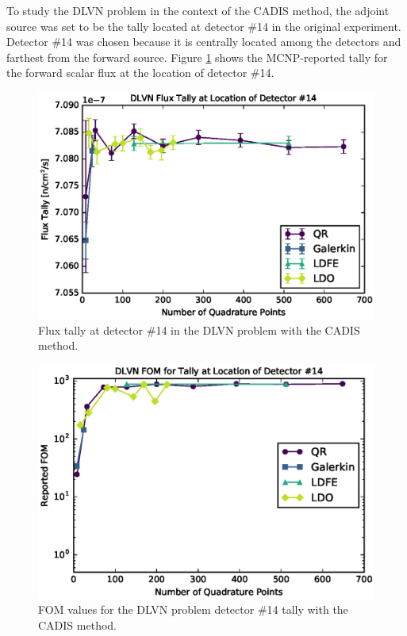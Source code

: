 \documentclass{article} %
\begin{document}
To study the DLVN problem in the context of the CADIS method, the adjoint
source was set to be the tally located at detector \#14 in the original
experiment. Detector \#14 was chosen because it is centrally located among the
detectors and farthest from the forward source. Figure \ref{dlvn-cad-tally}
shows the MCNP-reported tally for the forward scalar flux at the location of
detector \#14.

\begin{figure}[!htb]
\centering
\includegraphics[max height=0.445\textheight]{dlvn-cadis-tally.eps}
\caption{Flux tally at detector \#14 in the DLVN problem with the CADIS method.}
\label{dlvn-cad-tally}
\end{figure}

\begin{figure}[!htb]
\centering
\includegraphics[max height=0.445\textheight]{dlvn-cadis-fom.eps}
\caption{FOM values for the DLVN problem detector \#14 tally with the CADIS 
         method.}
\label{dlvn-cad-fom}
\end{figure}
\end{document}
